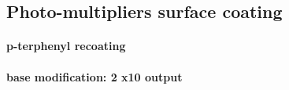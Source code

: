 \subsection{Photo-multipliers surface coating}

\paragraph{p-terphenyl recoating}
\paragraph{base modification: 2 x10 output}
